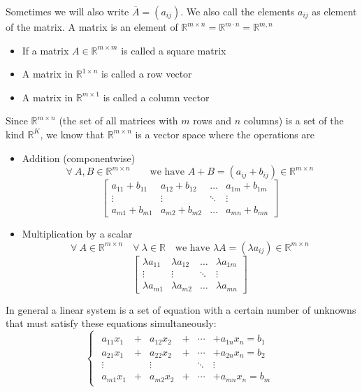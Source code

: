 Sometimes we will also write $\overline{A} = (a_{ij})$. We also call the elements $a_{ij}$ as element of the matrix. A matrix is an element of $\mathbb{R}^{m\times n} = \mathbb{R}^{m\cdot n} = \mathbb{R}^{m,n} $
\begin{itemize}
    \item[] If a matrix $A \in \mathbb{R}^{m\times m}$ is called a square matrix 
    \item[] A matrix in $\mathbb{R}^{1 \times n}$ is called a row vector 
    \item[] A matrix in $\mathbb{R}^{m\times 1}$ is called a column vector  
\end{itemize}
Since $\mathbb{R}^{m \times n}$ (the set of all matrices with $m$ rows and $n$ columns) is a set of the kind $\mathbb{R}^K$, we know that $\mathbb{R}^{m \times n}$ is a vector space where the operations are 
\begin{itemize}
    \item Addition (componentwise)
    $$\forall \ A,B \in \mathbb{R}^{m \times n} \qquad \text{we have } A+B=(a_{ij} + b_{ij}) \in \mathbb{R}^{m\times n}$$
    $$\begin{bmatrix}
        a_{11}+b_{11} &a_{12}+b_{12} &\dots &a_{1m}+b_{1m} \\
        \vdots &\vdots &\ddots &\vdots\\
        a_{m1}+b_{m1} &a_{m2}+b_{m2} &\dots &a_{mn}+b_{mn}
    \end{bmatrix}$$
    \item Multiplication by a scalar
    $$\forall \ A \in \mathbb{R}^{m\times n} \quad \forall \ \lambda \in \mathbb{R} \quad \text{we have } \lambda A = (\lambda a_{ij}) \in \mathbb{R}^{m \times n}$$
    $$\begin{bmatrix}
        \lambda a_{11} &\lambda a_{12} &\dots &\lambda a_{1m} \\
        \vdots &\vdots &\ddots &\vdots\\
        \lambda a_{m1} &\lambda a_{m2} &\dots &\lambda a_{mn}
    \end{bmatrix}$$
\end{itemize}
In general a linear system is a set of equation with a certain number of unknowns that must satisfy these equations simultaneously:
\[
\begin{cases}
\begin{array}{cccccc}
a_{11}x_1 &+& a_{12}x_2 &+& \cdots &+ a_{1n}x_n = b_1\\
a_{21}x_1 &+& a_{22}x_2 &+& \cdots &+ a_{2n}x_n = b_2\\
\vdots    && \vdots    && \ddots & \vdots\\
a_{m1}x_1 &+& a_{m2}x_2 &+& \cdots &+ a_{mn}x_n = b_m
\end{array}
\end{cases}
\]

